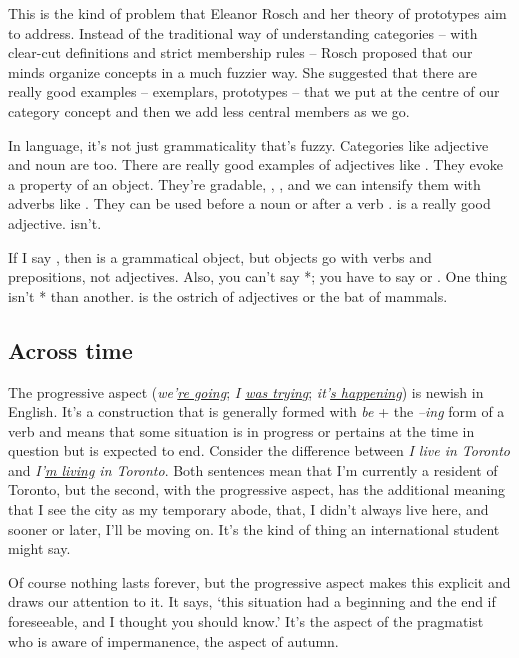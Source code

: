 This is the kind of problem that Eleanor Rosch and her theory of prototypes aim to address. Instead of the traditional way of understanding categories -- with clear-cut definitions and strict membership rules -- Rosch proposed that our minds organize concepts in a much fuzzier way. She suggested that there are really good examples -- exemplars, prototypes -- that we put at the centre of our category concept and then we add less central members as we go.

In language, it's not just grammaticality that's fuzzy. Categories like adjective and noun are too. There are really good examples of adjectives like . They evoke a property of an object. They're gradable, , ,  and we can intensify them with adverbs like . They can be used before a noun  or after a verb .  is a really good adjective.  isn't.

If I say , then  is a grammatical object, but objects go with verbs and prepositions, not adjectives. Also, you can't say *; you have to say  or . One thing isn't * than another.  is the ostrich of adjectives or the bat of mammals.

\subsection{Across time}

The progressive aspect (\textit{we'\uline{re going}}; \textit{I \uline{was trying}}; \textit{it'\uline{s happening}}) is newish in English. It's a construction that is generally formed with \textit{be} + the \textit{--ing} form of a verb and means that some situation is in progress or pertains at the time in question but is expected to end. Consider the difference between \textit{I live in Toronto} and \textit{I'\uline{m living} in Toronto}. Both sentences mean that I'm currently a resident of Toronto, but the second, with the progressive aspect, has the additional meaning that I see the city as my temporary abode, that, I didn't always live here, and sooner or later, I'll be moving on. It's the kind of thing an international student might say.

Of course nothing lasts forever, but the progressive aspect makes this explicit and draws our attention to it. It says, `this situation had a beginning and the end if foreseeable, and I thought you should know.' It's the aspect of the pragmatist who is aware of impermanence, the aspect of autumn.

